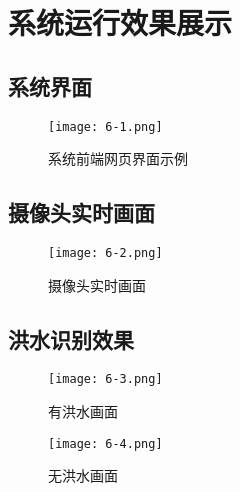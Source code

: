 \chapter{系统运行效果展示}

\section{系统界面}

\begin{figure}[H]
    \centering
    \texttt{[image: 6-1.png]}
    \caption{系统前端网页界面示例}
    \label{fig:web_main_page}
\end{figure}

\section{摄像头实时画面}

\begin{figure}[H]
    \centering
    \texttt{[image: 6-2.png]}
    \caption{摄像头实时画面}
    \label{fig:web_camera_live_image}
\end{figure}

\section{洪水识别效果}

\begin{figure}[H]
    \centering
    \texttt{[image: 6-3.png]}
    \caption{有洪水画面}
    \label{fig:web_flood_result}
\end{figure}

\begin{figure}[H]
    \centering
    \texttt{[image: 6-4.png]}
    \caption{无洪水画面}
    \label{fig:web_no_flood_result}
\end{figure}